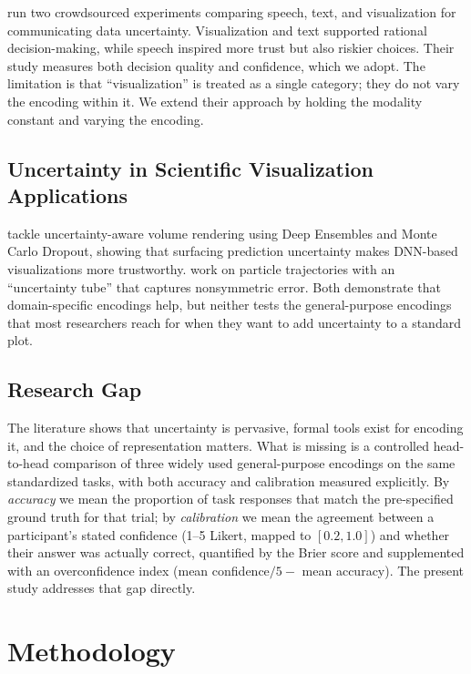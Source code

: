 \documentclass{article}
\begin{document}
\textcite{stokes2024} run two crowdsourced experiments comparing
speech, text, and visualization for communicating data uncertainty.
Visualization and text supported rational decision-making, while speech
inspired more trust but also riskier choices.  Their study measures
both decision quality and confidence, which we adopt.  The limitation
is that ``visualization'' is treated as a single category; they do not
vary the encoding within it.  We extend their approach by holding the
modality constant and varying the encoding.

\subsection{Uncertainty in Scientific Visualization Applications}

\textcite{saklani2024} tackle uncertainty-aware volume rendering using
Deep Ensembles and Monte Carlo Dropout, showing that surfacing
prediction uncertainty makes DNN-based visualizations more trustworthy.
\textcite{li2025} work on particle trajectories with an ``uncertainty
tube'' that captures nonsymmetric error.  Both demonstrate that
domain-specific encodings help, but neither tests the general-purpose
encodings that most researchers reach for when they want to add
uncertainty to a standard plot.

\subsection{Research Gap}

The literature shows that uncertainty is pervasive, formal tools
exist for encoding it, and the choice of representation matters.
What is missing is a controlled head-to-head comparison of three
widely used general-purpose encodings on the same standardized tasks,
with both accuracy and calibration measured explicitly.  By
\emph{accuracy} we mean the proportion of task responses that match
the pre-specified ground truth for that trial; by \emph{calibration}
we mean the agreement between a participant's stated confidence
(1--5 Likert, mapped to $[0.2, 1.0]$) and whether their answer was
actually correct, quantified by the Brier score and supplemented with
an overconfidence index (mean confidence$/5 -$ mean accuracy).  The
present study addresses that gap directly.

\section{Methodology}
\end{document}
